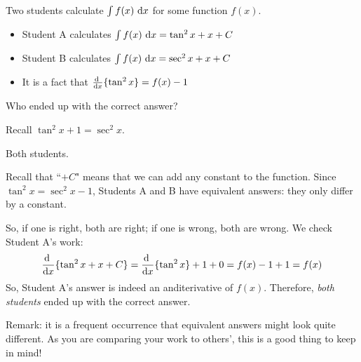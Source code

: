 \begin{Mquestion} Two students calculate $\int f(x)\ \dee{x}$ for some function $f(x)$.
\begin{itemize}
\item Student A calculates $\int f(x)\ \dee{x} = \tan^2 x + x + C$
\item Student B calculates $\int f(x)\ \dee{x} = \sec^2 x + x + C$
\item It is a fact that $\diff{}{x}\{\tan^2 x\} = f(x)-1$
\end{itemize}
Who ended up with the correct answer?
\end{Mquestion}
\begin{hint} Recall $\tan^2x+1=\sec^2 x$.
\end{hint}
\begin{answer}
Both students.
\end{answer}
\begin{solution}
Recall that ``$+C$" means that we can add any constant to the function. Since $\tan^2 x = \sec^2 x - 1$, Students A and B have equivalent answers: they only differ by a constant.

So, if one is right, both are right; if one is wrong, both are wrong. We check Student A's work:
\[\diff{}{x}\{\tan^2 x + x + C\}=\diff{}{x}\{\tan^2 x\} +1 + 0 = f(x)-1+1=f(x)\]
So, Student A's answer is indeed an anditerivative of $f(x)$. Therefore, \emph{both students} ended up with the correct answer.

Remark: it is a frequent occurrence that equivalent answers might look quite different. As you are comparing your work to others', this is a good thing to keep in mind!
\end{solution}



